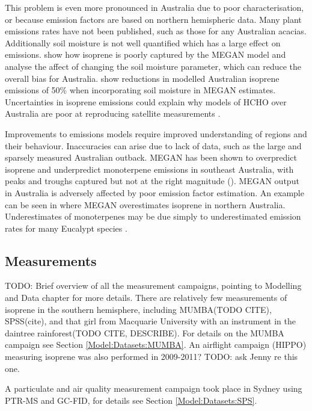     This problem is even more pronounced in Australia due to poor characterisation, or because emission factors are based on northern hemispheric data.
    Many plant emissions rates have not been published, such as those for any Australian acacias.
    Additionally soil moisture is not well quantified which has a large effect on emissions.
    \cite{Muller2008} show how isoprene is poorly captured by the MEGAN model and analyse the affect of changing the soil moisture parameter, which can reduce the overall bias for Australia.
    \cite{Sindelarova2014} show reductions in modelled Australian isoprene emissions of 50\% when incorporating soil moisture in MEGAN estimates. 
    Uncertainties in isoprene emissions could explain why models of HCHO over Australia are poor at reproducing satellite measurements \citep{Stavrakou2009}.
    
    Improvements to emissions models require improved understanding of regions and their behaviour.
    Inaccuracies can arise due to lack of data, such as the large and sparsely measured Australian outback.
    MEGAN has been shown to overpredict isoprene and underpredict monoterpene emissions in southeast Australia, with peaks and troughs captured but not at the right magnitude (\cite{Emmerson2016}).
    MEGAN output in Australia is adversely affected by poor emission factor estimation. 
    An example can be seen in \citet{Muller2008} where MEGAN overestimates isoprene in northern Australia.
    Underestimates of monoterpenes may be due simply to underestimated emission rates for many Eucalypt species \citep{Winters2009}.
  
  
  \subsection{Measurements}
    
    TODO: Brief overview of all the measurement campaigns, pointing to Modelling and Data chapter for more details.
    There are relatively few measurements of isoprene in the southern hemisphere, including MUMBA(TODO CITE), SPSS(cite), and that girl from Macquarie University with an instrument in the daintree rainforest(TODO CITE, DESCRIBE).
    For details on the MUMBA campaign see Section \ref{Model:Datasets:MUMBA}.
    An airflight campaign (HIPPO) measuring isoprene was also performed in 2009-2011? TODO: ask Jenny re this one.
    
    A particulate and air quality measurement campaign took place in Sydney using PTR-MS and GC-FID, for details see Section \ref{Model:Datasets:SPS}.
    
